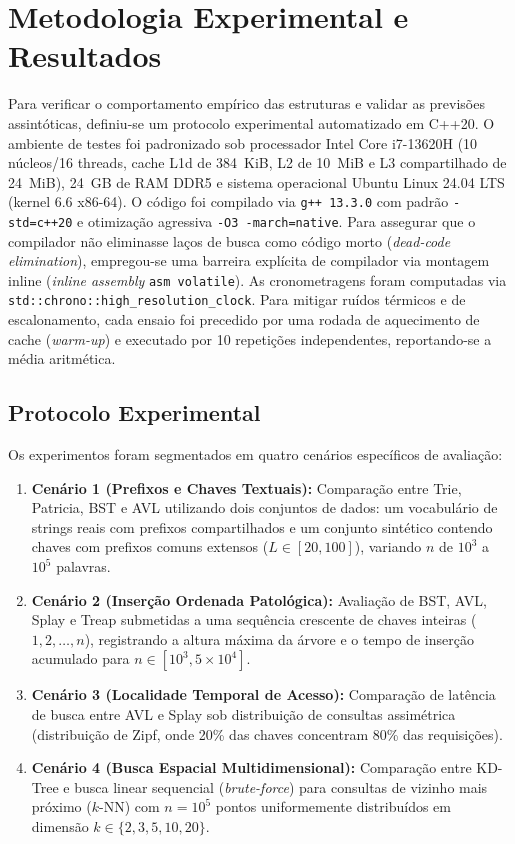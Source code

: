 \documentclass[11pt,a4paper]{article}
\begin{document}
\section{Metodologia Experimental e Resultados}

Para verificar o comportamento empírico das estruturas e validar as previsões assintóticas, definiu-se um protocolo experimental automatizado em C++20. O ambiente de testes foi padronizado sob processador Intel Core i7-13620H (10 núcleos/16 threads, cache L1d de 384~KiB, L2 de 10~MiB e L3 compartilhado de 24~MiB), 24~GB de RAM DDR5 e sistema operacional Ubuntu Linux 24.04 LTS (kernel 6.6 x86-64). O código foi compilado via \texttt{g++ 13.3.0} com padrão \texttt{-std=c++20} e otimização agressiva \texttt{-O3 -march=native}. Para assegurar que o compilador não eliminasse laços de busca como código morto (\textit{dead-code elimination}), empregou-se uma barreira explícita de compilador via montagem inline (\textit{inline assembly} \texttt{asm volatile}). As cronometragens foram computadas via \texttt{std::chrono::high\_resolution\_clock}. Para mitigar ruídos térmicos e de escalonamento, cada ensaio foi precedido por uma rodada de aquecimento de cache (\textit{warm-up}) e executado por 10 repetições independentes, reportando-se a média aritmética.

\subsection{Protocolo Experimental}
Os experimentos foram segmentados em quatro cenários específicos de avaliação:
\begin{enumerate}
  \item \textbf{Cenário 1 (Prefixos e Chaves Textuais):} Comparação entre Trie, Patricia, BST e AVL utilizando dois conjuntos de dados: um vocabulário de strings reais com prefixos compartilhados e um conjunto sintético contendo chaves com prefixos comuns extensos ($L \in [20, 100]$), variando $n$ de $10^3$ a $10^5$ palavras.
  \item \textbf{Cenário 2 (Inserção Ordenada Patológica):} Avaliação de BST, AVL, Splay e Treap submetidas a uma sequência crescente de chaves inteiras ($1, 2, \dots, n$), registrando a altura máxima da árvore e o tempo de inserção acumulado para $n \in [10^3, 5\times 10^4]$.
  \item \textbf{Cenário 3 (Localidade Temporal de Acesso):} Comparação de latência de busca entre AVL e Splay sob distribuição de consultas assimétrica (distribuição de Zipf, onde 20\% das chaves concentram 80\% das requisições).
  \item \textbf{Cenário 4 (Busca Espacial Multidimensional):} Comparação entre KD-Tree e busca linear sequencial (\textit{brute-force}) para consultas de vizinho mais próximo ($k\text{-NN}$) com $n=10^5$ pontos uniformemente distribuídos em dimensão $k \in \{2, 3, 5, 10, 20\}$.
\end{enumerate}
\end{document}
